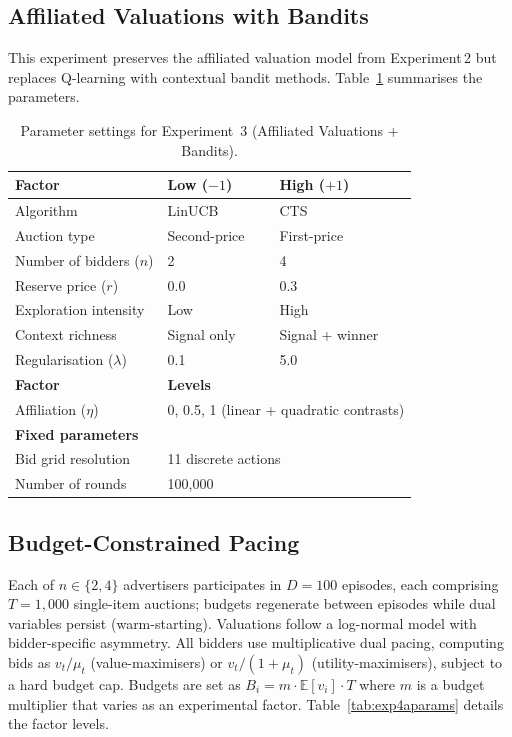 \subsection{Affiliated Valuations with Bandits}

This experiment preserves the affiliated valuation model from Experiment\,2 but replaces Q-learning with contextual bandit methods. Table~\ref{tab:exp3params} summarises the parameters.

\begin{table}[H]
\centering
\caption{Parameter settings for Experiment~3 (Affiliated Valuations + Bandits).}
\label{tab:exp3params}
\begin{tabular}{l l l}
\toprule
\textbf{Factor} & \textbf{Low ($-1$)} & \textbf{High ($+1$)}\\
\midrule
Algorithm & LinUCB & CTS \\
Auction type & Second-price & First-price \\
Number of bidders ($n$) & 2 & 4 \\
Reserve price ($r$) & 0.0 & 0.3 \\
Exploration intensity & Low & High \\
Context richness & Signal only & Signal + winner \\
Regularisation ($\lambda$) & 0.1 & 5.0 \\
\midrule
\textbf{Factor} & \multicolumn{2}{l}{\textbf{Levels}} \\
\midrule
Affiliation ($\eta$) & \multicolumn{2}{l}{0, 0.5, 1 (linear + quadratic contrasts)} \\
\midrule
\multicolumn{3}{l}{\textbf{Fixed parameters}} \\
\midrule
Bid grid resolution & \multicolumn{2}{l}{11 discrete actions} \\
Number of rounds & \multicolumn{2}{l}{100{,}000} \\
\bottomrule
\end{tabular}
\end{table}

\subsection{Budget-Constrained Pacing}

Each of $n \in \{2, 4\}$ advertisers participates in $D = 100$ episodes, each comprising $T = 1{,}000$ single-item auctions; budgets regenerate between episodes while dual variables persist (warm-starting). Valuations follow a log-normal model with bidder-specific asymmetry. All bidders use multiplicative dual pacing, computing bids as $v_t / \mu_t$ (value-maximisers) or $v_t / (1 + \mu_t)$ (utility-maximisers), subject to a hard budget cap. Budgets are set as $B_i = m \cdot \mathbb{E}[v_i] \cdot T$ where $m$ is a budget multiplier that varies as an experimental factor. Table~\ref{tab:exp4aparams} details the factor levels.


